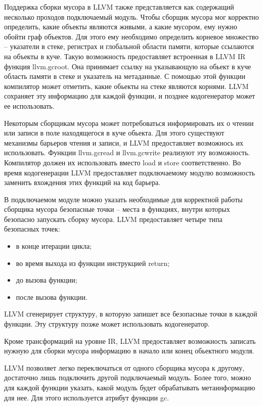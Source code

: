 \documentclass[14pt]{extarticle}
\begin{document}
Поддержка сборки мусора в LLVM также представляется как содержащий несколько проходов подключаемый модуль. Чтобы сборщик мусора мог корректно определить, какие объекты являются живыми, а какие мусором, ему нужно обойти граф объектов. Для этого ему необходимо определить корневое множество -- указатели в стеке, регистрах и глобальной области памяти, которые ссылаются на объекты в куче. Такую возможность предоставляет встроенная в LLVM IR функция llvm.gcroot. Она принимает ссылку на указывающую на обьект в куче область памяти в стеке и указатель на метаданные. С помощью этой функции компилятор может отметить, какие обьекты на стеке являются корнями. LLVM сохраняет эту информацию для каждой функции, и позднее кодогенератор может ее использовать.

Некоторым сборщикам мусора может потребоваться информировать их о чтении или записи в поле находящегося в куче обьекта. Для этого  существуют механизмы барьеров чтения и записи, и LLVM предоставляет возможнось их использовать. Функции llvm.gcread и llvm.gcwrite реализуют эту возможность. Компилятор должен их использовать вместо load и store соответственно. Во время кодогенерации LLVM предоставляет подключаемому модулю возможность заменить вхождения этих функций на код барьера.

В подключаемом модуле можно указать необходимые для корректной работы сборщика мусора безопасные точки -- места в функциях, внутри которых безопасно запускать сборку мусора. LLVM предоставляет четыре типа безопасных точек:
\begin{itemize}
\item
  в конце итерации цикла;
\item
  во время выхода из функции инструкцией return;
\item
  до вызова функции;
\item
  после вызова функции.
\end{itemize}
LLVM сгенерирует структуру, в которую запишет все безопасные точки в каждой функции. Эту структуру позже может использовать кодогенератор.

Кроме трансформаций на уровне IR, LLVM предоставляет возможность записать нужную для сборки мусора информацию в начало или конец обьектного модуля.

LLVM позволяет легко переключаться от одного сборщика мусора к другому, достаточно лишь подключить другой подключаемый модуль. Более того, можно для каждой функции указать, какой модуль будет обрабатывать метаинформацию для нее. Для этого используется атрибут функции gc. 
\end{document}
